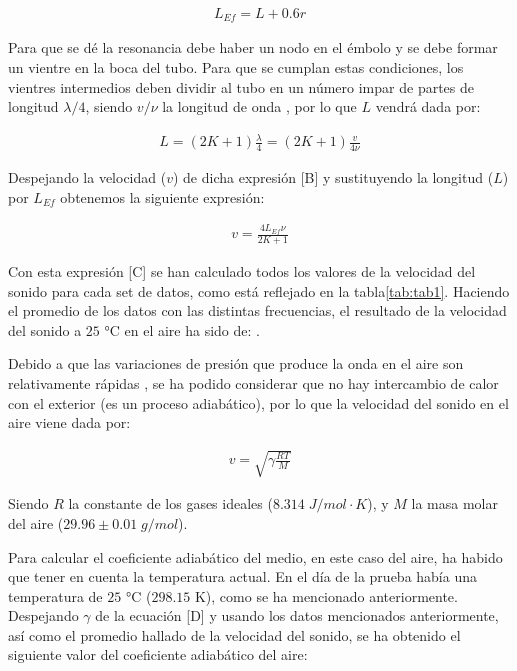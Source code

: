 \documentclass[fleqn,usenatbib,openbib]{mnras}
\begin{document}
\begin{gather}
    L_{Ef} = L+0.6r
\end{gather}

Para que se dé la resonancia debe haber un nodo en el émbolo y se debe formar un vientre en la boca del tubo. Para que se cumplan estas condiciones, los vientres intermedios deben dividir al tubo en un número impar de partes de longitud $\lambda/4$, siendo $v/\nu$ la longitud de onda \cite{labuam}, por lo que $L$ vendrá dada por:

\begin{gather}
    L = (2K+1)\frac{\lambda}{4} = (2K+1)\frac{v}{4\nu}
\end{gather}

Despejando la velocidad ($v$) de dicha expresión [B] y sustituyendo la longitud ($L$) por $L_{Ef}$ obtenemos la siguiente expresión:

\begin{gather}
    v = \frac{4L_{Ef}\nu}{2K+1}
\end{gather}

Con esta expresión [C] se han calculado todos los valores de la velocidad del sonido para cada set de datos, como está reflejado en la tabla\cref{tab:tab1}. Haciendo el promedio de los datos con las distintas frecuencias, el resultado de la velocidad del sonido a $25$ °C en el aire ha sido de: . \bigskip


Debido a que las variaciones de presión que produce la onda en el aire son relativamente rápidas \cite{labuam}, se ha podido considerar que no hay intercambio de calor con el exterior (es un proceso adiabático), por lo que la velocidad del sonido en el aire viene dada por:

\begin{gather}
    v = \sqrt{\gamma\frac{RT}{M}}
\end{gather}

Siendo $R$ la constante de los gases ideales ($8.314\; J/mol\cdot K$), y $M$ la masa molar del aire ($29.96\pm0.01\; g/mol$).

Para calcular el coeficiente adiabático del medio, en este caso del aire, ha habido que tener en cuenta la temperatura actual. En el día de la prueba había una temperatura de $25$ °C ($298.15$ K), como se ha mencionado anteriormente. Despejando $\gamma$ de la ecuación [D] y usando los datos mencionados anteriormente, así como el promedio hallado de la velocidad del sonido, se ha obtenido el siguiente valor del coeficiente adiabático del aire:
\end{document}
